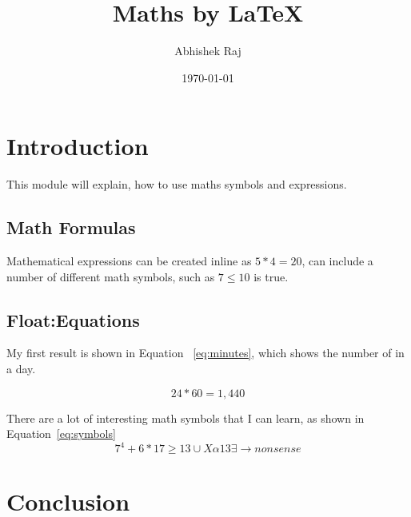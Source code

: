 \documentclass{article}
\title{Maths by \LaTeX}
\author{Abhishek Raj}
\date{\today}
\begin{document}
	\maketitle
	
	\section{Introduction}
	This module will explain, how to use maths symbols and expressions.
	
	\subsection{Math Formulas}
	Mathematical expressions can be created inline as $5 * 4 = 20$, can include a number of different math symbols, such as $7 \leq 10$ is true.
	
	\subsection{Float:Equations}
	My first result is shown in Equation ~\ref{eq:minutes}, which shows the number of in a day.
	
	\begin{equation}
	24 * 60 = 1,440
	\label{eq:minutes}
	\end{equation}
	
	There are a lot of interesting math symbols that I can learn, as shown in Equation~\ref{eq:symbols}
	\begin{equation}
	7^4 + 6*17 \geq 13 \cup X \alpha 13 \exists \rightarrow nonsense
	\label{eq:symbols}
	\end{equation}
	
	\section{Conclusion}
\end{document}

